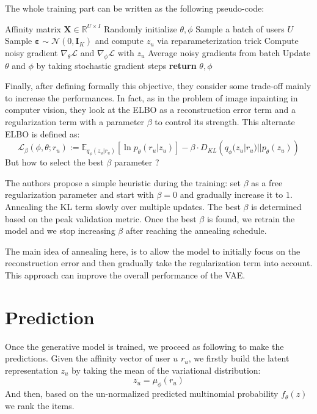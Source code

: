 The whole training part can be written as the following pseudo-code:

\begin{algorithm}
\caption{VAE-SGD Training collaborative filtering VAE with stochastic gradient descent from \cite{liang2018variational}.}
\begin{algorithmic}[1]
\Require Affinity matrix $\mathbf{X} \in \mathbb{R}^{U \times I}$
\State Randomly initialize $\theta, \phi$
    \State Sample a batch of users $U$
        \State Sample $\mathbf{\varepsilon} \sim \mathcal{N}(0, \mathbf{I}_K)$ and compute $z_u$ via reparameterization trick
        \State Compute noisy gradient $\nabla_\theta \mathcal{L}$ and $\nabla_\phi \mathcal{L}$ with $z_u$
    \EndFor
    \State Average noisy gradients from batch
    \State Update $\theta$ and $\phi$ by taking stochastic gradient steps
\EndWhile
\State \textbf{return} $\theta, \phi$
\end{algorithmic}
\end{algorithm}

Finally, after defining formally this objective, they consider some trade-off mainly to increase the performances. In fact, as in the problem of image inpainting in computer vision, they look at the ELBO as a reconstruction error term and a regularization term with a parameter $\beta$ to control its strength. This alternate ELBO is defined as:
\[
\mathcal{L}_{\beta}(\phi, \theta ; r_u) := \mathbb{E}_{q_{\phi}(z_u|r_u)} \left[ \ln{p_{\theta}(r_u| z_u)} \right] - \beta \cdot D_{KL}\left( q_{\phi}(z_u|r_u) || p_{\theta}(z_u) \right)
\]
But how to select the best $\beta$ parameter ?

The authors propose a simple heuristic during the training: set $\beta$ as a free regularization parameter and start with $\beta = 0$ and gradually increase it to $1$. Annealing the KL term slowly over multiple updates. The best $\beta$ is determined based on the peak validation metric. Once the best $\beta$ is found, we retrain the model and we stop increasing $\beta$ after reaching the annealing schedule. 

The main idea of annealing here, is to allow the model to initially focus on the reconstruction error and then gradually take the regularization term into account. This approach can improve the overall performance of the VAE.


\section{Prediction}
Once the generative model is trained, we proceed as following to make the predictions. Given the affinity vector of user $u$ $r_u$, we firstly build the latent representation $z_u$ by taking the mean of the variational distribution:
\[
z_u = \mu_{\phi}(r_u)
\]
And then, based on the un-normalized predicted multinomial probability $f_{\theta}(z)$ we rank the items.

